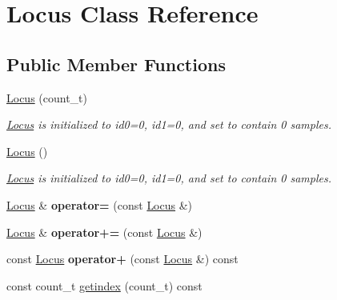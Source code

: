\hypertarget{classLocus}{\section{Locus Class Reference}
\label{classLocus}
}
\subsection*{Public Member Functions}
\begin{DoxyCompactItemize}
\item 
\hypertarget{classLocus_a0bee741faae71aa0bb9d809e0b98f3c3}{\hyperlink{classLocus_a0bee741faae71aa0bb9d809e0b98f3c3}{Locus} (count\-\_\-t)}\label{classLocus_a0bee741faae71aa0bb9d809e0b98f3c3}

\begin{DoxyCompactList}\small\item\em \hyperlink{classLocus}{Locus} is initialized to id0=0, id1=0, and set to contain 0 samples. \end{DoxyCompactList}\item 
\hypertarget{classLocus_a66f73ca4df29ccd3cb96118a81ea2d38}{\hyperlink{classLocus_a66f73ca4df29ccd3cb96118a81ea2d38}{Locus} ()}\label{classLocus_a66f73ca4df29ccd3cb96118a81ea2d38}

\begin{DoxyCompactList}\small\item\em \hyperlink{classLocus}{Locus} is initialized to id0=0, id1=0, and set to contain 0 samples. \end{DoxyCompactList}\item 
\hypertarget{classLocus_a10fa5e45cb2e6d773011709ec24df6ea}{\hyperlink{classLocus}{Locus} \& {\bfseries operator=} (const \hyperlink{classLocus}{Locus} \&)}\label{classLocus_a10fa5e45cb2e6d773011709ec24df6ea}

\item 
\hypertarget{classLocus_a1f7ae8e08054efe9ea5494355234c9a1}{\hyperlink{classLocus}{Locus} \& {\bfseries operator+=} (const \hyperlink{classLocus}{Locus} \&)}\label{classLocus_a1f7ae8e08054efe9ea5494355234c9a1}

\item 
\hypertarget{classLocus_ae052797fc97726c62b7833b28d3fbafc}{const \hyperlink{classLocus}{Locus} {\bfseries operator+} (const \hyperlink{classLocus}{Locus} \&) const }\label{classLocus_ae052797fc97726c62b7833b28d3fbafc}

\item 
\hypertarget{classLocus_ae3ad620c40a800ef73992da5766839c1}{const count\-\_\-t \hyperlink{classLocus_ae3ad620c40a800ef73992da5766839c1}{getindex} (count\-\_\-t) const }\label{classLocus_ae3ad620c40a800ef73992da5766839c1}


\end{DoxyCompactItemize}
